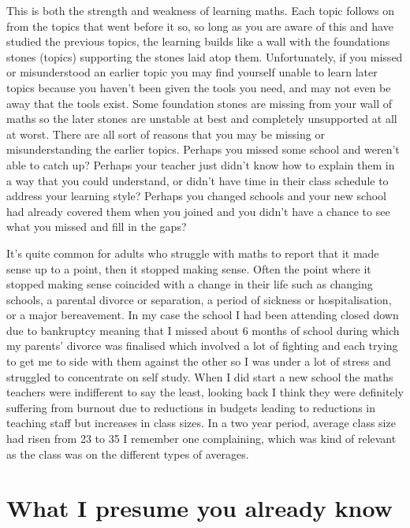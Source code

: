 This is both the strength and weakness of learning maths.  Each topic follows on from the topics that went before it so, so long as you are aware of this and have studied the previous topics, the learning builds like a wall with the foundations stones (topics) supporting the stones laid atop them.  Unfortunately, if you missed or misunderstood  an earlier topic you may find yourself unable to learn later topics because you haven't been given the tools you need, and may not even be away that the tools exist.  Some foundation stones are missing from your wall of maths so the later stones are unstable at best and completely unsupported at all at worst.  There are all sort of reasons that you may be missing or misunderstanding the earlier topics.  Perhaps you missed some school and weren't able to catch up?  Perhaps your teacher just didn't know how to explain them in a way that you could understand, or didn't have time in their class schedule to address your learning style?  Perhaps you changed schools and your new school had already covered them when you joined and you didn't have a chance to see what you missed and fill in the gaps?

It's quite common for adults who struggle with maths to report that it made sense up to a point, then it stopped making sense.  Often the point where it stopped making sense coincided with a change in their life such as changing schools, a parental divorce or separation, a period of sickness or hospitalisation, or a major bereavement.  In my case the school I had been attending closed down due to bankruptcy meaning that I missed about 6 months of school during which my parents' divorce was finalised which involved a lot of fighting and each trying to get me to side with them against the other so I was under a lot of stress and struggled to concentrate on self study.  When I did start a new school the maths teachers were indifferent to say the least, looking back I think they were definitely suffering from burnout due to reductions in budgets leading to reductions in teaching staff but increases in class sizes.  In a two year period, average class size had risen from 23 to 35 I remember one complaining, which was kind of relevant as the class was on the different types of averages.

\section{What I presume you already know}
